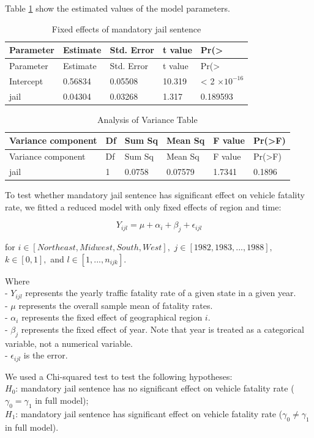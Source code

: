 \documentclass[]{article}
\begin{document}
Table \ref{tab:fix} show the estimated values of the model parameters.

\begin{longtable}[]{@{}lllll@{}}
\caption{\label{tab:fix}Fixed effects of mandatory jail sentence}\tabularnewline
\toprule
Parameter & Estimate & Std. Error & t value & Pr(\textgreater{}\tabularnewline
\midrule
\endfirsthead
\toprule
Parameter & Estimate & Std. Error & t value & Pr(\textgreater{}\tabularnewline
\midrule
\endhead
Intercept & 0.56834 & 0.05508 & 10.319 & \textless{} 2 \(\times 10^{-16}\)\tabularnewline
jail & 0.04304 & 0.03268 & 1.317 & 0.189593\tabularnewline
\bottomrule
\end{longtable}

\begin{longtable}[]{@{}llllll@{}}
\caption{\label{tab:anova}Analysis of Variance Table}\tabularnewline
\toprule
Variance component & Df & Sum Sq & Mean Sq & F value & Pr(\textgreater{}F)\tabularnewline
\midrule
\endfirsthead
\toprule
Variance component & Df & Sum Sq & Mean Sq & F value & Pr(\textgreater{}F)\tabularnewline
\midrule
\endhead
jail & 1 & 0.0758 & 0.07579 & 1.7341 & 0.1896\tabularnewline
\bottomrule
\end{longtable}

To test whether mandatory jail sentence has significant effect on vehicle fatality rate, we fitted a reduced model with only fixed effects of region and time:

\[
Y_{ijl} = \mu + \alpha_i + \beta_j + \epsilon_{ijl}
\]

for \(i \in [Northeast, Midwest, South, West],\) \(j \in [1982, 1983, ..., 1988],\) \(k \in [0, 1],\) and \(l \in [1, ..., n_{ijk}]\).

Where\\
- \(Y_{ijl}\) represents the yearly traffic fatality rate of a given state in a given year.\\
- \(\mu\) represents the overall sample mean of fatality rates.\\
- \(\alpha_i\) represents the fixed effect of geographical region \(i\).\\
- \(\beta_j\) represents the fixed effect of year. Note that year is treated as a categorical variable, not a numerical variable.\\
- \(\epsilon_{ijl}\) is the error.

We used a Chi-squared test to test the following hypotheses:\\
\(H_0\): mandatory jail sentence has no significant effect on vehicle fatality rate (\(\gamma_0 = \gamma_1\) in full model);\\
\(H_1\): mandatory jail sentence has significant effect on vehicle fatality rate (\(\gamma_0 \neq \gamma_1\) in full model).
\end{document}
